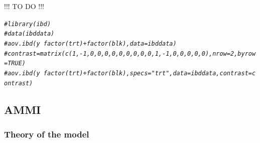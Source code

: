 \documentclass{book}\usepackage[]{graphicx}\usepackage[]{color}
\makeatletter
\newcommand{\hlcom}[1]{\textcolor[rgb]{0.678,0.584,0.686}{\textit{#1}}}%
\newenvironment{kframe}{%
 \def\at@end@of@kframe{}%
 \ifinner\ifhmode%
  \def\at@end@of@kframe{\end{minipage}}%
  \begin{minipage}{\columnwidth}%
 \fi\fi%
 \def\FrameCommand##1{\hskip\@totalleftmargin \hskip-\fboxsep
 \colorbox{shadecolor}{##1}\hskip-\fboxsep
     \hskip-\linewidth \hskip-\@totalleftmargin \hskip\columnwidth}%
 \MakeFramed {\advance\hsize-\width
   \@totalleftmargin\z@ \linewidth\hsize
   \@setminipage}}%
 {\par\unskip\endMakeFramed%
 \at@end@of@kframe}
\newenvironment{knitrout}{}{} %
\makeatother
\begin{document}
!!! TO DO !!!

\begin{knitrout}
\color{fgcolor}\begin{kframe}
\begin{alltt}
\hlcom{#library(ibd)}
\hlcom{#data(ibddata)}
\hlcom{#aov.ibd(y~factor(trt)+factor(blk),data=ibddata)}
\hlcom{#contrast=matrix(c(1,-1,0,0,0,0,0,0,0,0,0,1,-1,0,0,0,0,0),nrow=2,byrow=TRUE)}
\hlcom{#aov.ibd(y~factor(trt)+factor(blk),specs="trt",data=ibddata,contrast=contrast)}
\end{alltt}
\end{kframe}
\end{knitrout}


\subsection{AMMI}
\label{ammi}

\subsubsection{Theory of the model}
\end{document}
